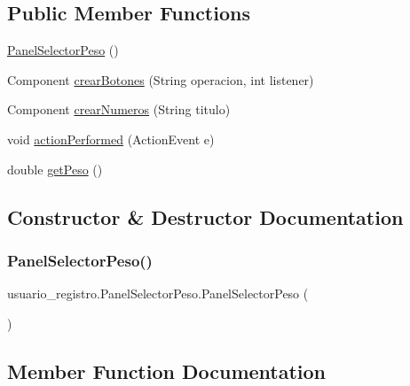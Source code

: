 \subsection*{Public Member Functions}
\begin{DoxyCompactItemize}
\item 
\mbox{\hyperlink{classusuario__registro_1_1_panel_selector_peso_af2e7fd07e00f253a47965ab330041842}{Panel\+Selector\+Peso}} ()
\item 
Component \mbox{\hyperlink{classusuario__registro_1_1_panel_selector_peso_a3aad04387c80d8f2a42e40954ad0aa96}{crear\+Botones}} (String operacion, int listener)
\item 
Component \mbox{\hyperlink{classusuario__registro_1_1_panel_selector_peso_aa36a5cc068b99730b333b2b9dc575c3a}{crear\+Numeros}} (String titulo)
\item 
void \mbox{\hyperlink{classusuario__registro_1_1_panel_selector_peso_a2b2f8a56718a5490c0f6322bf7d39dd2}{action\+Performed}} (Action\+Event e)
\item 
double \mbox{\hyperlink{classusuario__registro_1_1_panel_selector_peso_ae7d3c53e5691340a0a9ec48c9eec9aa4}{get\+Peso}} ()
\end{DoxyCompactItemize}


\subsection{Constructor \& Destructor Documentation}
\mbox{\label{classusuario__registro_1_1_panel_selector_peso_af2e7fd07e00f253a47965ab330041842}} 
\subsubsection{\texorpdfstring{Panel\+Selector\+Peso()}{PanelSelectorPeso()}}
{\footnotesize\ttfamily usuario\+\_\+registro.\+Panel\+Selector\+Peso.\+Panel\+Selector\+Peso (\begin{DoxyParamCaption}{ }\end{DoxyParamCaption})}



\subsection{Member Function Documentation}
\mbox{\label{classusuario__registro_1_1_panel_selector_peso_a2b2f8a56718a5490c0f6322bf7d39dd2}} 

